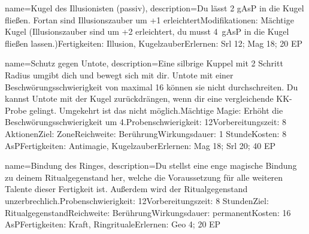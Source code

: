 {
    name={Kugel des Illusionisten (passiv)},
    description={Du lässt 2 gAsP in die Kugel fließen. Fortan sind Illusionszauber um +1 erleichtert\newline Modifikationen: Mächtige Kugel (Illusionszauber sind um +2 erleichtert, du musst 4 gAsP in die Kugel fließen lassen.)\newline Fertigkeiten: Illusion, Kugelzauber\newline Erlernen: Srl 12; Mag 18; 20 EP}
}


{
    name={Schutz gegen Untote},
    description={Eine silbrige Kuppel mit 2 Schritt Radius umgibt dich und bewegt sich mit dir. Untote mit einer Beschwörungsschwierigkeit von maximal 16 können sie nicht durchschreiten. Du kannst Untote mit der Kugel zurückdrängen, wenn dir eine vergleichende KK-Probe gelingt. Umgekehrt ist das nicht möglich.\newline Mächtige Magie: Erhöht die Beschwörungsschwierigkeit um 4.\newline Probenschwierigkeit: 12\newline Vorbereitungszeit: 8 Aktionen\newline Ziel: Zone\newline Reichweite: Berührung\newline Wirkungsdauer: 1 Stunde\newline Kosten: 8 AsP\newline Fertigkeiten: Antimagie, Kugelzauber\newline Erlernen: Mag 18; Srl 20; 40 EP}
}


{
    name={Bindung des Ringes},
    description={Du stellst eine enge magische Bindung zu deinem Ritualgegenstand her, welche die Voraussetzung für alle weiteren Talente dieser Fertigkeit ist. Außerdem wird der Ritualgegenstand unzerbrechlich.\newline Probenschwierigkeit: 12\newline Vorbereitungszeit: 8 Stunden\newline Ziel: Ritualgegenstand\newline Reichweite: Berührung\newline Wirkungsdauer: permanent\newline Kosten: 16 AsP\newline Fertigkeiten: Kraft, Ringrituale\newline Erlernen: Geo 4; 20 EP}
}


